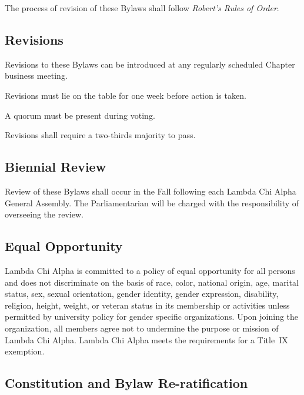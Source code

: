 \documentclass{article}
\begin{document}
The process of revision of these Bylaws shall follow \emph{Robert’s Rules of
Order}.

\subsection{Revisions}

\begin{subsubsectionList}
  \item Revisions to these Bylaws can be introduced at any regularly scheduled
  Chapter business meeting.

  \item Revisions must lie on the table for one week before action is taken.

  \item A quorum must be present during voting.

  \item Revisions shall require a two-thirds majority to pass.
\end{subsubsectionList}

\subsection{Biennial Review}

Review of these Bylaws shall occur in the Fall following each Lambda Chi Alpha
General Assembly. The Parliamentarian will be charged with the responsibility of
overseeing the review.

\subsection{Equal Opportunity}

Lambda Chi Alpha is committed to a policy of equal opportunity for all persons
and does not discriminate on the basis of race, color, national origin, age,
marital status, sex, sexual orientation, gender identity, gender expression,
disability, religion, height, weight, or veteran status in its membership or
activities unless permitted by university policy for gender specific
organizations. Upon joining the organization, all members agree not to undermine
the purpose or mission of Lambda Chi Alpha. Lambda Chi Alpha meets the
requirements for a Title~IX exemption.

\subsection{Constitution and Bylaw Re-ratification}
\end{document}
